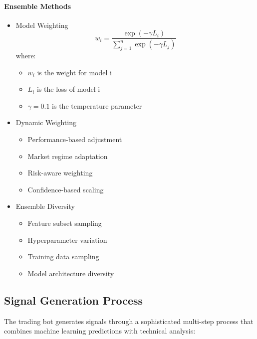 \documentclass[conference]{IEEEtran}
\begin{document}
\paragraph{Ensemble Methods}
\begin{itemize}
    \item Model Weighting
    \begin{equation}
    w_i = \frac{\exp(-\gamma L_i)}{\sum_{j=1}^n \exp(-\gamma L_j)}
    \end{equation}
    where:
    \begin{itemize}
        \item $w_i$ is the weight for model i
        \item $L_i$ is the loss of model i
        \item $\gamma = 0.1$ is the temperature parameter
    \end{itemize}
    
    \item Dynamic Weighting
    \begin{itemize}
        \item Performance-based adjustment
        \item Market regime adaptation
        \item Risk-aware weighting
        \item Confidence-based scaling
    \end{itemize}
    
    \item Ensemble Diversity
    \begin{itemize}
        \item Feature subset sampling
        \item Hyperparameter variation
        \item Training data sampling
        \item Model architecture diversity
    \end{itemize}
\end{itemize}

\subsection{Signal Generation Process}
The trading bot generates signals through a sophisticated multi-step process that combines machine learning predictions with technical analysis:
\end{document}
